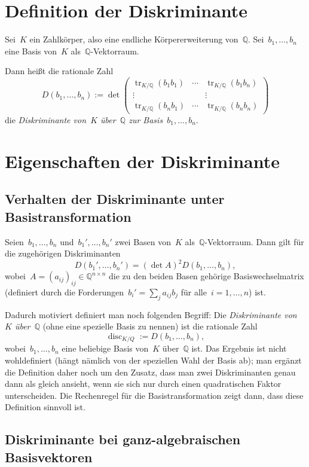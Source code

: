\documentclass[12pt,a4paper,ngerman]{scrartcl}
\newcommand{\Q}{\mathbb{Q}}
\theoremstyle{definition}
\theoremstyle{plain}
\theoremstyle{remark}
\newcommand{\tr}[1]{\operatorname{tr}_{K/\Q}(#1)}
\begin{document}
\section*{Definition der Diskriminante}

Sei~$K$ ein Zahlkörper, also eine endliche Körpererweiterung von~$\Q$.
Sei~$b_1, \ldots, b_n$ eine Basis von~$K$ als~$\Q$-Vektorraum.

Dann heißt die rationale Zahl
\[ D(b_1,\ldots,b_n) := \operatorname{det} \begin{pmatrix}
  \tr{b_1b_1} & \cdots & \tr{b_1b_n} \\
  \vdots & & \vdots \\
  \tr{b_nb_1} & \cdots & \tr{b_nb_n}
\end{pmatrix} \]
die \emph{Diskriminante von~$K$ über~$\Q$ zur Basis~$b_1,\ldots,b_n$}.


\section*{Eigenschaften der Diskriminante}

\subsection*{Verhalten der Diskriminante unter Basistransformation}

Seien~$b_1,\ldots,b_n$ und~$b_1',\ldots,b_n'$ zwei Basen von~$K$
als~$\Q$-Vektorraum. Dann gilt für die zugehörigen Diskriminanten
\[ D(b_1',\ldots,b_n') = (\operatorname{det} A)^2 D(b_1,\ldots,b_n), \]
wobei~$A =(a_{ij})_{ij} \in \Q^{n \times n}$ die zu den beiden Basen gehörige
Basiswechselmatrix (definiert durch die Forderungen~$b_i' = \sum_j a_{ij} b_j$
für alle~$i = 1,\ldots,n$) ist.

Dadurch motiviert definiert man noch folgenden Begriff: Die \emph{Diskriminante von~$K$
über~$\Q$} (ohne eine spezielle Basis zu nennen) ist die rationale Zahl
\[ \operatorname{disc}_{K/Q} := D(b_1,\ldots,b_n), \]
wobei~$b_1,\ldots,b_n$ eine beliebige Basis von~$K$ über~$\Q$ ist. Das Ergebnis
ist nicht wohldefiniert (hängt nämlich von der speziellen Wahl der Basis ab);
man ergänzt die Definition daher noch um den Zusatz, dass man zwei
Diskriminanten genau dann als gleich ansieht, wenn sie sich nur durch einen
quadratischen Faktor unterscheiden.
Die Rechenregel für die Basistransformation zeigt dann, dass diese Definition
sinnvoll ist.


\subsection*{Diskriminante bei ganz-algebraischen Basisvektoren}
\end{document}
